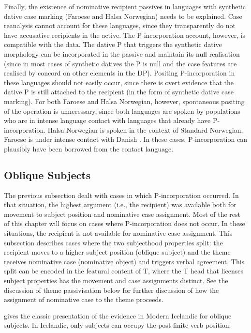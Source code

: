 Finally, the existence of nominative recipient passives in languages with synthetic dative case marking (Faroese and Halsa Norwegian) needs to be explained. Case reanalysis cannot account for these languages, since they transparently do not have accusative recipients in the active. The P-incorporation account, however, is compatible with the data. The dative P that triggers the synthetic dative morphology can be incorporated in the passive and maintain its null realisation (since in most cases of synthetic datives the P is null and the case features are realised by concord on other elements in the DP). Positing P-incorporation in these languages should not easily occur, since there is overt evidence that the dative P is still attached to the recipient (in the form of synthetic dative case marking). For both Faroese and Halsa Norwegian, however, spontaneous positing of the operation is unnecessary, since both languages are spoken by populations who are in intense language contact with languages that already have P-incorporation. Halsa Norwegian is spoken in the context of Standard Norwegian. Faroese is under intense contact with Danish \citep{petersen.2010}. In these cases, P-incorporation can plausibly have been borrowed from the contact language.


\subsection{Oblique Subjects}
The previous subsection dealt with cases in which P-incorporation occurred. In that situation, the highest argument (i.e., the recipient) was available both for movement to subject position and nominative case assignment. Most of the rest of this chapter will focus on cases where P-incorporation does not occur. In these situations, the recipient is not available for nominative case assignment. This subsection describes cases where the two subjecthood properties split: the recipient moves to a higher subject position (oblique subject) and the theme receives nominative case (nominative object) and triggers verbal agreement. This split can be encoded in the featural content of T, where the T head that licenses subject properties has the movement and case assignments distinct. See the discussion of theme passivisation below for further discussion of how the assignment of nominative case to the theme proceeds.

\cite{Zaenen.1985} gives the classic presentation of the evidence in Modern Icelandic for oblique subjects. In Icelandic, only subjects can occupy the post-finite verb position:

